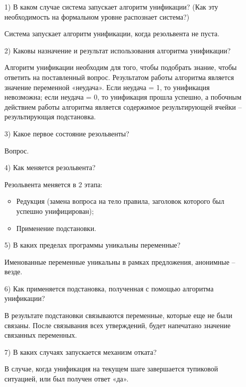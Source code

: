 \documentclass[12pt, a4paper]{extarticle}
\begin{document}
\begin{enumerate} 
	
	\item[1)] В каком случае система запускает алгоритм унификации? (Как эту необходимость на формальном уровне распознает система?)
	
	Система запускает алгоритм унификации, когда резольвента не пуста.
	
	\item[2)] Каковы назначение и результат использования алгоритма унификации? 
	
	Алгоритм унификации необходим для того, чтобы подобрать знание, чтобы
	ответить на поставленный вопрос. Результатом работы алгоритма является
	значение переменной «неудача». Если неудача = 1, то унификация невозможна;
	если неудача = 0, то унификация прошла успешно, а побочным действием работы
	алгоритма является содержимое результирующей ячейки – результирующая
	подстановка.
	
	\item[3)] Какое первое состояние резольвенты?
	
	Вопрос. 
	
	\item[4)] Как меняется резольвента?
	
	Резольвента меняется в 2 этапа:
	\begin{itemize}
		\item Редукция (замена вопроса на тело правила, заголовок которого был успешно унифицирован);
		\item Применение подстановки.
	\end{itemize}
	
	\item[5)] В каких пределах программы уникальны переменные? 
	
	Именованные переменные уникальны в рамках предложения, анонимные --  везде.
		
	\item[6)] Как применяется подстановка, полученная с помощью алгоритма унификации?
	
	В результате подстановки связываются переменные, которые еще не были
	связаны. После связывания всех утверждений, будет напечатано значение
	связанных переменных.
	
	\item[7)] В каких случаях запускается механизм отката?
	
	В случае, когда унификация на текущем шаге завершается тупиковой
	ситуацией, или был получен ответ «да».	
\end{enumerate}
\end{document}
